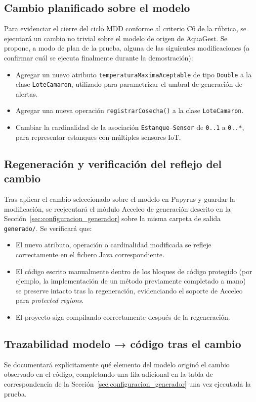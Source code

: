 \documentclass[11pt,a4paper]{article}
\begin{document}
\subsection{Cambio planificado sobre el modelo}
Para evidenciar el cierre del ciclo MDD conforme al criterio C6 de la rúbrica, se ejecutará un cambio
no trivial sobre el modelo de origen de AquaGest. Se propone, a modo de plan de la prueba, alguna de
las siguientes modificaciones (a confirmar cuál se ejecuta finalmente durante la demostración):
\begin{itemize}[nosep]
  \item Agregar un nuevo atributo \texttt{temperaturaMaximaAceptable} de tipo \texttt{Double} a la
        clase \texttt{LoteCamaron}, utilizado para parametrizar el umbral de generación de alertas.
  \item Agregar una nueva operación \texttt{registrarCosecha()} a la clase \texttt{LoteCamaron}.
  \item Cambiar la cardinalidad de la asociación \texttt{Estanque}--\texttt{Sensor} de \texttt{0..1} a
        \texttt{0..*}, para representar estanques con múltiples sensores IoT.
\end{itemize}

\subsection{Regeneración y verificación del reflejo del cambio}
Tras aplicar el cambio seleccionado sobre el modelo en Papyrus y guardar la modificación, se
reejecutará el módulo Acceleo de generación descrito en la Sección~\ref{sec:configuracion_generador}
sobre la misma carpeta de salida \texttt{generado/}. Se verificará que:
\begin{itemize}[nosep]
  \item El nuevo atributo, operación o cardinalidad modificada se refleje correctamente en el fichero
        Java correspondiente.
  \item El código escrito manualmente dentro de los bloques de código protegido (por ejemplo, la
        implementación de un método previamente completado a mano) se preserve intacto tras la
        regeneración, evidenciando el soporte de Acceleo para \textit{protected regions}.
  \item El proyecto siga compilando correctamente después de la regeneración.
\end{itemize}

\subsection{Trazabilidad modelo → código tras el cambio}
Se documentará explícitamente qué elemento del modelo originó el cambio observado en el código,
completando una fila adicional en la tabla de correspondencia de la
Sección~\ref{sec:configuracion_generador} una vez ejecutada la prueba.
\end{document}
